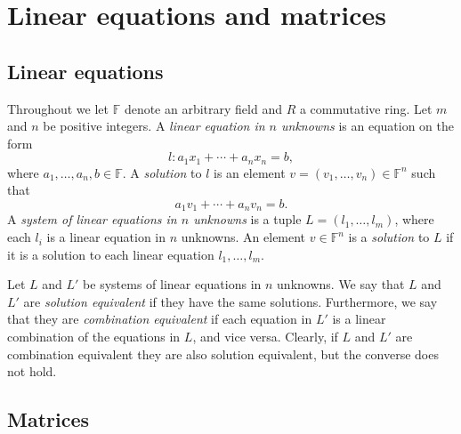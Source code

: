 \documentclass[article, a4paper, 11pt, oneside]{memoir}
\title{\doctitle}
\author{\docauthor}
\numberwithin{equation}{chapter}
\newcommand{\field}{\mathbb{F}}
\begin{document}
\maketitle

\chapter{Linear equations and matrices}

\section{Linear equations}

Throughout we let $\field$ denote an arbitrary field and $R$ a commutative ring. Let $m$ and $n$ be positive integers. A \emph{linear equation in $n$ unknowns} is an equation on the form
%
\begin{equation*}
    l \colon a_1 x_1 + \cdots + a_n x_n = b,
\end{equation*}
%
where $a_1, \ldots, a_n, b \in \field$. A \emph{solution} to $l$ is an element $v = (v_1, \ldots, v_n) \in \field^n$ such that
%
\begin{equation*}
    a_1 v_1 + \cdots + a_n v_n = b.
\end{equation*}
%
A \emph{system of linear equations in $n$ unknowns} is a tuple $L = (l_1, \ldots, l_m)$, where each $l_i$ is a linear equation in $n$ unknowns. An element $v \in \field^n$ is a \emph{solution} to $L$ if it is a solution to each linear equation $l_1, \ldots, l_m$.

Let $L$ and $L'$ be systems of linear equations in $n$ unknowns. We say that $L$ and $L'$ are \emph{solution equivalent} if they have the same solutions. Furthermore, we say that they are \emph{combination equivalent} if each equation in $L'$ is a linear combination of the equations in $L$, and vice versa. Clearly, if $L$ and $L'$ are combination equivalent they are also solution equivalent, but the converse does not hold.


\section{Matrices}
\end{document}
